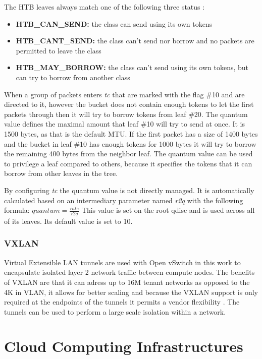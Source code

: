 The HTB leaves always match one of the following three status \cite{htb-qdiscs}:
\begin{itemize}
\item \textbf{HTB\_CAN\_SEND:} the class can send using its own tokens
\item \textbf{HTB\_CANT\_SEND:} the class can't send nor borrow and no packets are permitted to leave the class
\item \textbf{HTB\_MAY\_BORROW:} the class can't send using its own tokens, but can try to borrow from another class
\end{itemize}

When a group of packets enters \textit{tc} that are marked with the flag \#10 and are directed to it, however the bucket does not contain enough tokens to let the first packets through then it will try to borrow tokens from leaf \#20. The quantum value defines the maximal amount that leaf \#10 will try to send at once. It is 1500 bytes, as that is the default MTU. If the first packet has a size of 1400 bytes and the bucket in leaf \#10 has enough tokens for 1000 bytes it will try to borrow the remaining 400 bytes from the neighbor leaf. The quantum value can be used to privilege a leaf compared to others, because it specifies the tokens that it can borrow from other leaves in the tree.

By configuring \textit{tc} the quantum value is not directly managed. It is automatically calculated based on an intermediary parameter named \textit{r2q} with the following formula:  $ quantum = \frac{rate}{r2q} $ This value is set on the root qdisc and is used across all of its leaves. Its default value is set to 10.


\subsubsection{VXLAN}

Virtual Extensible LAN tunnels are used with Open vSwitch in this work to encapsulate isolated layer 2 network traffic between compute nodes. The benefits of VXLAN are that it can adress up to 16M tenant networks as opposed to the 4K in VLAN, it allows for better scaling and because the VXLAN support is only required at the endpoints of the tunnels it permits a vendor flexibility \cite{openstack-vxlan}. The tunnels can be used to perform a large scale isolation within a network.


\section{Cloud Computing Infrastructures}


